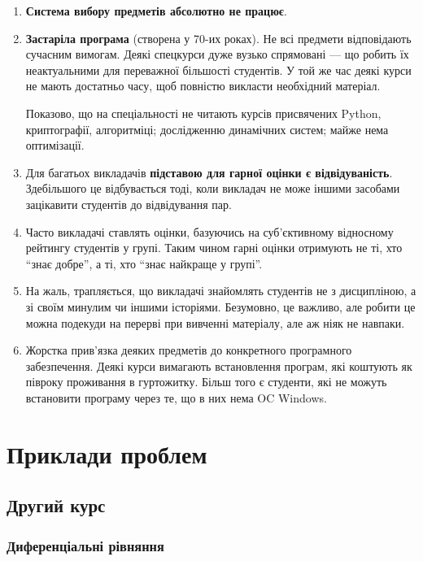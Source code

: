 \documentclass[14pt, a4paper]{extarticle}  %
\begin{document}
\begin{enumerate}
    \item \textbf{Система вибору предметів абсолютно не працює}. 
    
    \item \textbf{Застаріла програма} (створена у 70-их роках). Не всі предмети відповідають сучасним вимогам. Деякі спецкурси дуже вузько спрямовані --- що робить їх неактуальними для переважної більшості студентів. У той же час деякі курси не мають достатньо часу, щоб повністю викласти необхідний матеріал. 
    
    Показово, що на спеціальності не читають курсів присвячених Python, криптографії, алгоритміці; дослідженню динамічних систем; майже нема оптимізації. 
    
    \item  Для багатьох викладачів \textbf{підставою для гарної оцінки є відвідуваність}. Здебільшого це відбувається тоді, коли викладач не може іншими засобами зацікавити студентів до відвідування пар. 
    
    \item Часто викладачі ставлять оцінки, базуючись на суб'єктивному відносному рейтингу студентів у групі. Таким чином гарні оцінки отримують не ті, хто ``знає добре'', а ті, хто ``знає найкраще у групі''.
    
    \item На жаль, трапляється, що викладачі знайомлять студентів не з дисципліною, а зі своїм минулим чи іншими історіями. Безумовно, це важливо, але робити це можна подекуди на перерві при вивченні матеріалу, але аж ніяк не навпаки.
    
    \item Жорстка прив'язка деяких предметів до конкретного програмного забезпечення. Деякі курси вимагають встановлення програм, які коштують як півроку проживання в гуртожитку. Більш того є студенти, які не можуть встановити програму через те, що в них нема OC Windows.
\end{enumerate}

\newpage
\section{Приклади проблем}
\subsection{Другий курс}

\subsubsection{Диференціальні рівняння}
\end{document}
